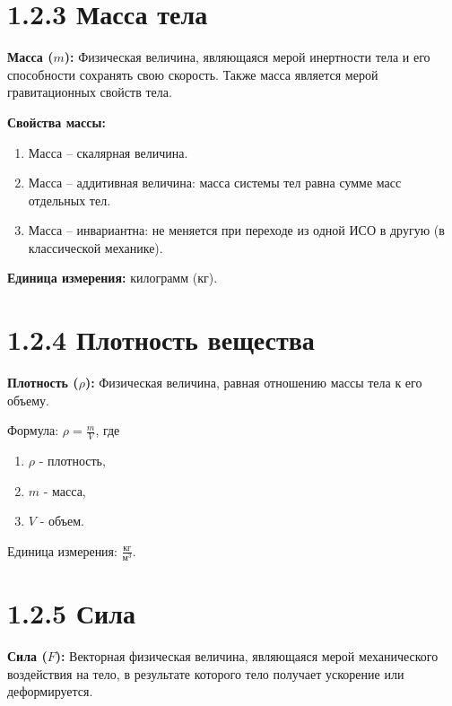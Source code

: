 \documentclass[a4paper,12pt]{article}
\begin{document}
\section*{1.2.3 Масса тела}
\vspace{-9pt}
\textbf{Масса ($m$):} Физическая величина, являющаяся мерой инертности тела и его способности сохранять свою скорость. Также масса является мерой гравитационных свойств тела.
\vspace{-3pt}

\textbf{Свойства массы:}
\begin{enumerate} [itemsep=0pt, topsep=0pt, parsep=3pt]
    \item Масса – скалярная величина.
    \item Масса – аддитивная величина: масса системы тел равна сумме масс отдельных тел.
    \item Масса – инвариантна: не меняется при переходе из одной ИСО в другую (в классической механике).
\end{enumerate}
\textbf{Единица измерения:} килограмм (кг).

\section*{1.2.4 Плотность вещества}
\vspace{-9pt}
\textbf{Плотность ($\rho$):} Физическая величина, равная отношению массы тела к его объему.
\vspace{-3pt}

Формула: $\rho = \frac{m}{V}$, где
\begin{enumerate} [itemsep=0pt, topsep=0pt, parsep=3pt]
    \item $\rho$ - плотность,
    \item $m$ - масса,
    \item $V$ - объем.
\end{enumerate}
Единица измерения: $\frac{кг}{м^3}$.


\newpage


\section*{1.2.5 Сила}
\vspace{-9pt}
\textbf{Сила ($F$):} Векторная физическая величина, являющаяся мерой механического воздействия на тело, в результате которого тело получает ускорение или деформируется.
\vspace{-3pt}
\end{document}
